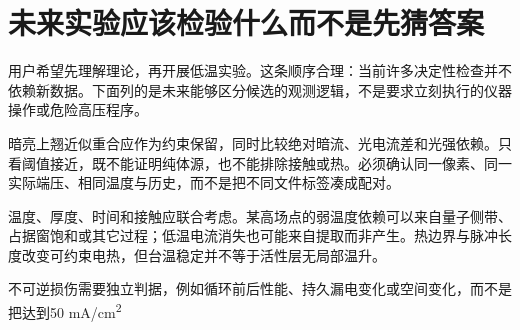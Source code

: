 \documentclass[11pt,a4paper]{article}
\begin{document}
\section{{\cjkfont 未来实验应该检验什么而不是先猜答案}\allowbreak{}}\label{sec:57}
{\cjkfont 用户希望先理解理论，再开展低温实验。这条顺序合理：当前许多决定性检查并不依赖新数据。下面列的是未来能够区分候选的观测逻辑，不是要求立刻执行的仪器操作或危险高压程序。}\allowbreak{}
\par
{\cjkfont 暗亮上翘近似重合应作为约束保留，同时比较绝对暗流、光电流差和光强依赖。只看阈值接近，既不能证明纯体源，也不能排除接触或热。必须确认同一像素、同一实际端压、相同温度与历史，而不是把不同文件标签凑成配对。}\allowbreak{}
\par
{\cjkfont 温度、厚度、时间和接触应联合考虑。某高场点的弱温度依赖可以来自量子侧带、占据窗饱和或其它过程；低温电流消失也可能来自提取而非产生。热边界与脉冲长度改变可约束电热，但台温稳定并不等于活性层无局部温升。}\allowbreak{}
\par
{\cjkfont 不可逆损伤需要独立判据，例如循环前后性能、持久漏电变化或空间变化，而不是把达到}\allowbreak{}50 mA/cm\textsuperscript{2}\allowbreak{}
\par
\end{document}
